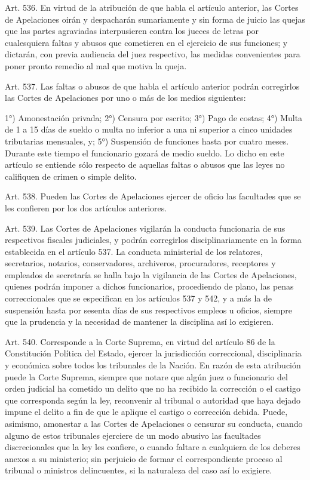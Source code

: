     Art. 536. En virtud de la atribución de que habla el artículo anterior, las Cortes de Apelaciones oirán y despacharán sumariamente y sin forma de juicio las quejas que las partes agraviadas interpusieren contra los jueces de letras por cualesquiera faltas y abusos que cometieren en el ejercicio de sus funciones; y dictarán, con previa audiencia del juez respectivo, las medidas convenientes para poner pronto remedio al mal que motiva la queja.


    Art. 537. Las faltas o abusos de que habla el artículo anterior podrán corregirlos las Cortes de Apelaciones por uno o más de los medios siguientes:

    1°) Amonestación privada;
    2°) Censura por escrito;
    3°) Pago de costas;
    4°)  Multa de 1 a 15 días de sueldo o multa no inferior a una ni superior a cinco unidades tributarias mensuales, y;
    5°) Suspensión de funciones hasta por cuatro meses. Durante este tiempo el funcionario gozará de medio sueldo.
    Lo dicho en este artículo se entiende sólo respecto de aquellas faltas o abusos que las leyes no califiquen de crimen o simple delito.



    Art. 538. Pueden las Cortes de Apelaciones ejercer de oficio las facultades que se les confieren por los dos artículos anteriores.


    Art. 539. Las Cortes de Apelaciones vigilarán la conducta funcionaria de sus respectivos fiscales judiciales, y podrán corregirlos disciplinariamente en la forma establecida en el artículo 537.
    La conducta ministerial de los relatores, secretarios, notarios, conservadores, archiveros, procuradores, receptores y empleados de secretaría se halla bajo la vigilancia de las Cortes de Apelaciones, quienes podrán imponer a dichos funcionarios, procediendo de plano, las penas correccionales que se especifican en los artículos 537 y 542, y a más la de suspensión hasta por sesenta días de sus respectivos empleos u oficios, siempre que la prudencia y la necesidad de mantener la disciplina así lo exigieren.



    Art. 540. Corresponde a la Corte Suprema, en virtud del artículo 86 de la Constitución Política del Estado, ejercer la jurisdicción correccional, disciplinaria y económica sobre todos los tribunales de la Nación.
    En razón de esta atribución puede la Corte Suprema, siempre que notare que algún juez o funcionario del orden judicial ha cometido un delito que no ha recibido la corrección o el castigo que corresponda según la ley, reconvenir al tribunal o autoridad que haya dejado impune el delito a fin de que le aplique el castigo o corrección debida.
    Puede, asimismo, amonestar a las Cortes de Apelaciones o censurar su conducta, cuando alguno de estos tribunales ejerciere de un modo abusivo las facultades discrecionales que la ley les confiere, o cuando faltare a cualquiera de los deberes anexos a su ministerio; sin perjuicio de formar el correspondiente proceso al tribunal o ministros delincuentes, si la naturaleza del caso así lo exigiere.



